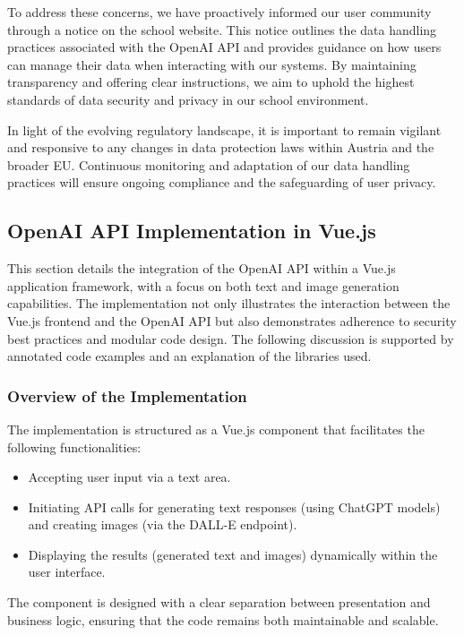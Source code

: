 \cite{OpenAI-privacy-complaint-Austria}

To address these concerns, we have proactively informed our user community through a notice on the school website. 
This notice outlines the data handling practices associated with the OpenAI API and provides guidance on how users can manage their data when 
interacting with our systems. By maintaining transparency and offering clear instructions, 
we aim to uphold the highest standards of data security and privacy in our school environment.

In light of the evolving regulatory landscape, it is important to remain vigilant and responsive to any changes in data protection laws within 
Austria and the broader EU. Continuous monitoring and adaptation of our data handling practices will ensure ongoing compliance and the safeguarding of user privacy. 


\subsection{OpenAI API Implementation in Vue.js}
\label{sec:openai-api-implementation}
This section details the integration of the OpenAI API within a Vue.js application framework, with a focus on both text and image generation capabilities. The implementation not only illustrates the interaction between the Vue.js frontend and the OpenAI API but also demonstrates adherence to security best practices and modular code design. The following discussion is supported by annotated code examples and an explanation of the libraries used.

\subsubsection{Overview of the Implementation}

The implementation is structured as a Vue.js component that facilitates the following functionalities:
\begin{itemize}
    \item Accepting user input via a text area.
    \item Initiating API calls for generating text responses (using ChatGPT models) and creating images (via the DALL-E endpoint).
    \item Displaying the results (generated text and images) dynamically within the user interface.
\end{itemize}

The component is designed with a clear separation between presentation and business logic, ensuring that the code remains both maintainable and scalable.


